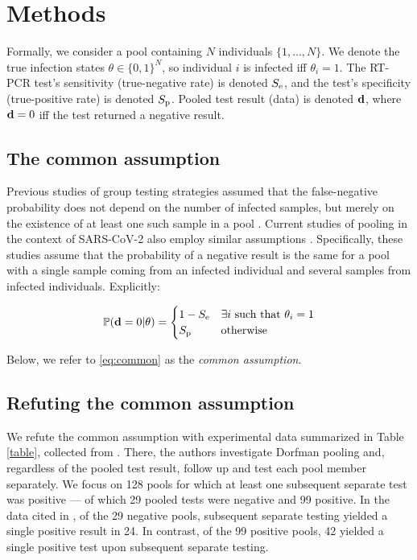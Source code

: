 \documentclass{article}
\begin{document}
\section*{Methods}

Formally, we consider a pool containing $N$ individuals
$\{1,\dots,N\}$. We denote the true infection states $\theta \in
\{0,1\}^N$, so individual $i$ is infected iff $\theta_i=1$. The RT-PCR
test's sensitivity (true-negative rate) is denoted $S_{\text{e}}$, and the
test's specificity (true-positive rate) is denoted $S_{\text{p}}$. Pooled
test result (data) is denoted $\mathbf{d}$, where $\mathbf{d}=0$ iff the test
returned a negative result.

\subsection*{The common assumption}\label{subsec:common}
Previous studies of group testing strategies assumed that the
false-negative probability does not depend on the number of infected
samples, but merely on the existence of at least one such sample in a
pool \cite{Kim, OptimalDorfmanPool}. Current studies of pooling in the
context of SARS-CoV-2 also employ similar assumptions
\cite{Simplistic1, Simplistic2}. Specifically, these studies assume
that the probability of a negative result is the same for a pool with
a single sample coming from an infected individual and several
 samples from infected individuals. Explicitly:

\begin{align}\label{eq:common}
  \mathbb{P}(\mathbf{d}=0|\theta) = 
  \begin{cases} 
    1-S_{\text{e}} & \exists i\ \text{such that } \theta_i = 1\\
    S_{\text{p}} & \text{otherwise}
  \end{cases} 
\end{align}

Below, we refer to \eqref{eq:common} as the \emph{common
  assumption}. 


\subsection*{Refuting the common assumption}\label{subsec:refute}
We refute the common assumption with experimental data summarized in
Table \ref{table}, collected from \cite{Salazar}. There, the authors
investigate Dorfman pooling and, regardless of the pooled test result,
follow up and test each pool member separately. We focus on 128 pools
for which at least one subsequent separate test was positive --- of
which 29 pooled tests were negative and 99 positive. In the data cited
in \cite{Salazar}, of the 29 negative pools, subsequent separate
testing yielded a single positive result in 24. In contrast, of the 99
positive pools, 42 yielded a single positive test upon subsequent
separate testing.
\end{document}

